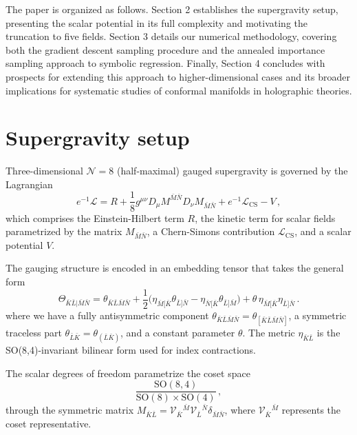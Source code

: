 \documentclass[11pt,a4paper]{article}
\newcommand{\bK}{{\bar{K}}}
\newcommand{\bL}{{\bar{L}}}
\newcommand{\bM}{{\bar{M}}}
\newcommand{\bN}{{\bar{N}}}
\begin{document}
The paper is organized as follows. Section 2 establishes the supergravity setup, presenting the scalar potential in its full complexity and motivating the truncation to five fields. Section 3 details our numerical methodology, covering both the gradient descent sampling procedure and the annealed importance sampling approach to symbolic regression. Finally, Section 4 concludes with prospects for extending this approach to higher-dimensional cases and its broader implications for systematic studies of conformal manifolds in holographic theories.

\section{Supergravity setup} \label{sec:sugra}
Three-dimensional $\mathcal{N}=8$ (half-maximal) gauged supergravity is governed by the Lagrangian
%
\begin{equation}	\label{eq: lagrangian_rephrased} 
	e^{-1}\mathcal{L}=R+\frac1{8}g^{\mu\nu}D_\mu M^{\bM\bN}D_\nu M_{\bM\bN}+e^{-1}\mathcal{L}_{\text{CS}}-V\,,
\end{equation}
%
which comprises the Einstein-Hilbert term $R$, the kinetic term for scalar fields parametrized by the matrix $M_{\bM\bN}$, a Chern-Simons contribution $\mathcal{L}_{\text{CS}}$, and a scalar potential $V$.

The gauging structure is encoded in an embedding tensor that takes the general form
%
\begin{equation}	\label{eq: embtensor_rephrased}
	\Theta_{\bK\bL\vert\bM\bN}=\theta_{\bK\bL\bM\bN}+\frac12\Big(\eta_{\bM[\bK}\theta_{\bL]\bN}-\eta_{\bN[\bK}\theta_{\bL]\bM}\Big)+\theta\,\eta_{\bM[\bK}\eta_{\bL]\bN}\,.
\end{equation}
%
where we have a fully antisymmetric component $\theta_{\bK\bL\bM\bN}=\theta_{[\bK\bL\bM\bN]}$, a symmetric traceless part $\theta_{\bL\bK}=\theta_{(\bL\bK)}$, and a constant parameter $\theta$. The metric $\eta_{\bK\bL}$ is the SO(8,4)-invariant bilinear form used for index contractions.

The scalar degrees of freedom parametrize the coset space
%
\begin{equation}	\label{eq: scalarcoset_rephrased}
	\frac{\text{SO}(8,4)}{\text{SO}(8)\times\text{SO}(4)}\,,
\end{equation}
%
through the symmetric matrix $M_{\bK\bL}=\mathcal{V}_{\bK}{}^{\bM}\mathcal{V}_{\bL}{}^{\bN}\delta_{\bM\bN}$, where $\mathcal{V}_{\bK}{}^{\bM}$ represents the coset representative. 
\end{document}
